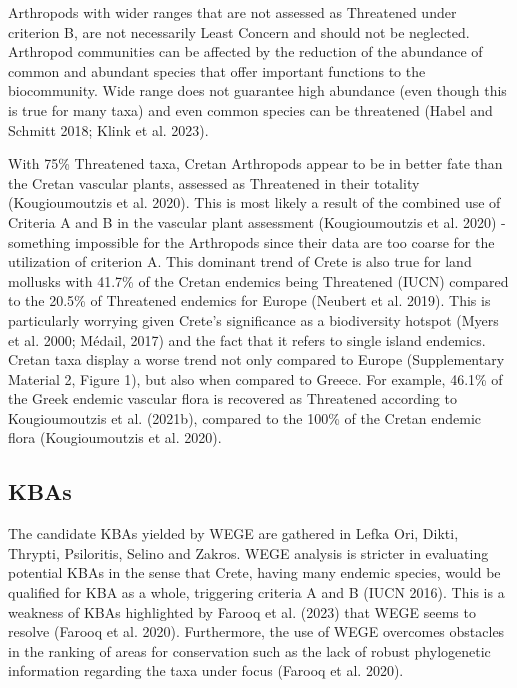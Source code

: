 Arthropods with wider ranges that are not assessed as Threatened under
criterion B, are not necessarily Least Concern and should not be neglected.
Arthropod communities can be affected by the reduction of the abundance of
common and abundant species that offer important functions to the biocommunity.
Wide range does not guarantee high abundance (even though this is true for many
taxa) and even common species can be threatened (Habel and Schmitt 2018; Klink et al. 2023).

With 75\% Threatened taxa, Cretan Arthropods appear to be in better fate than
the Cretan vascular plants, assessed as Threatened in their totality
(Kougioumoutzis et al. 2020). This is most likely a result of the combined use
of Criteria A and B in the vascular plant assessment (Kougioumoutzis et al. 2020) -
something impossible for the Arthropods since their data are too coarse for the
utilization of criterion A. This dominant trend of Crete is also true for land
mollusks with 41.7\% of the Cretan endemics being Threatened (IUCN) compared to
the 20.5\% of Threatened endemics for Europe (Neubert et al. 2019). This is
particularly worrying given Crete’s significance as a biodiversity
hotspot (Myers et al. 2000; Médail, 2017) and the fact that it refers to single
island endemics. Cretan taxa display a worse trend not only compared to Europe (Supplementary Material 2, Figure 1),
but also when compared to Greece. For example, 46.1\% of the Greek endemic
vascular flora is recovered as Threatened according to Kougioumoutzis et al. (2021b),
compared to the 100\% of the Cretan endemic flora (Kougioumoutzis et al. 2020). 
    
    \subsection{KBAs}
    \label{subsec:arthropods-KBAs}
    
The candidate KBAs yielded by WEGE are gathered in Lefka Ori, Dikti, Thrypti,
Psiloritis, Selino and Zakros. WEGE analysis is stricter in evaluating
potential KBAs in the sense that Crete, having many endemic species, would be
qualified for KBA as a whole, triggering criteria A and B (IUCN 2016).
This is a weakness of KBAs highlighted by Farooq et al. (2023) that WEGE seems
to resolve (Farooq et al. 2020). Furthermore, the use of WEGE overcomes
obstacles in the ranking of areas for conservation such as the lack of robust
phylogenetic information regarding the taxa under focus (Farooq et al. 2020).

